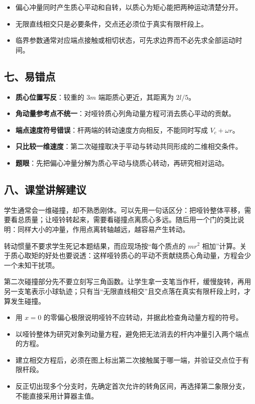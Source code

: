 \documentclass[12pt,a4paper,UTF8]{ctexart}
\newcommand{\tightlist}{\setlength{\itemsep}{0pt}\setlength{\parskip}{0pt}}
\begin{document}
\begin{itemize}
\tightlist
\item
  偏心冲量同时产生质心平动和自转，以质心为矩心能把两种运动清楚分开。
\item
  无限直线相交只是必要条件，交点还必须位于真实有限杆段上。
\item
  临界参数通常对应端点接触或相切状态，可先求边界而不必先求全部运动时间。
\end{itemize}

\subsection{七、易错点}\label{ux4e03ux6613ux9519ux70b9-1}

\begin{itemize}
\tightlist
\item
  \textbf{质心位置写反}：较重的 \(3m\) 端距质心更近，其距离为 \(2l/5\)。
\item
  \textbf{角动量参考点不统一}：对哑铃质心列角动量方程可消去质心平动的贡献。
\item
  \textbf{端点速度符号错误}：杆两端的转动速度方向相反，不能同时写成
  \(V_c+\omega r\)。
\item
  \textbf{只比较一维速度}：第二次碰撞取决于平动与转动共同形成的二维相交条件。
\item
  \textbf{题眼}：先把偏心冲量分解为质心平动与绕质心转动，再研究相对运动。
\end{itemize}

\subsection{八、课堂讲解建议}\label{ux516bux8bfeux5802ux8bb2ux89e3ux5efaux8bae-1}

学生通常会一维碰撞，却不熟悉刚体。可以先用一句话区分：把哑铃整体平移，需要看总质量；让哑铃转起来，需要看碰撞点离质心多远。随后用一个门的类比说明：同样大小的冲量，作用点离转轴越远，越容易产生转动。

转动惯量不要求学生死记本题结果，而应现场按``每个质点的 \(mr^2\)
相加''计算。关于质心取矩的好处也要说透：这样哑铃质心的平动不贡献绕质心角动量，方程会少一个未知干扰项。

第二次碰撞部分先不要立刻写三角函数。让学生拿一支笔当作杆，缓慢旋转，再用另一支笔表示小球轨迹；只有当``无限直线相交''且交点落在真实有限杆段上时，才算发生碰撞。

\begin{itemize}
\tightlist
\item
  用 \(x=0\) 的零偏心极限说明哑铃不应转动，并据此检查角动量方程的符号。
\item
  以哑铃整体为研究对象列动量方程，避免把无法消去的杆内冲量引入两个端点的方程。
\item
  建立相交方程后，必须在图上标出第二次接触属于哪一端，并验证交点位于有限杆段。
\item
  反正切出现多个分支时，先确定首次允许的转角区间，再选择第二象限分支，不能直接采用计算器主值。
\end{itemize}
\end{document}
